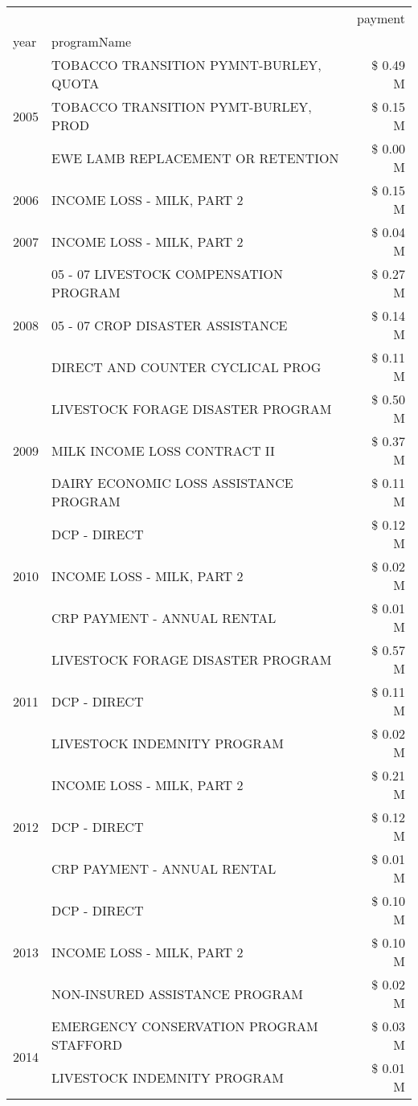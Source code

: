 \begin{tabular}{llr}
\toprule
 &  & payment \\
year & programName &  \\
\midrule
\multirow[t]{3}{*}{2005} & TOBACCO TRANSITION PYMNT-BURLEY, QUOTA & \$ 0.49 M \\
 & TOBACCO TRANSITION PYMT-BURLEY, PROD & \$ 0.15 M \\
 & EWE LAMB REPLACEMENT OR RETENTION & \$ 0.00 M \\
\cline{1-3}
2006 & INCOME LOSS - MILK, PART 2 & \$ 0.15 M \\
\cline{1-3}
2007 & INCOME LOSS - MILK, PART 2 & \$ 0.04 M \\
\cline{1-3}
\multirow[t]{3}{*}{2008} & 05 - 07 LIVESTOCK COMPENSATION PROGRAM & \$ 0.27 M \\
 & 05 - 07 CROP DISASTER ASSISTANCE & \$ 0.14 M \\
 & DIRECT AND COUNTER CYCLICAL PROG & \$ 0.11 M \\
\cline{1-3}
\multirow[t]{3}{*}{2009} & LIVESTOCK FORAGE DISASTER  PROGRAM & \$ 0.50 M \\
 & MILK INCOME LOSS CONTRACT II & \$ 0.37 M \\
 & DAIRY ECONOMIC LOSS ASSISTANCE PROGRAM & \$ 0.11 M \\
\cline{1-3}
\multirow[t]{3}{*}{2010} & DCP - DIRECT & \$ 0.12 M \\
 & INCOME LOSS - MILK, PART 2 & \$ 0.02 M \\
 & CRP PAYMENT - ANNUAL RENTAL & \$ 0.01 M \\
\cline{1-3}
\multirow[t]{3}{*}{2011} & LIVESTOCK FORAGE DISASTER PROGRAM & \$ 0.57 M \\
 & DCP - DIRECT & \$ 0.11 M \\
 & LIVESTOCK INDEMNITY PROGRAM & \$ 0.02 M \\
\cline{1-3}
\multirow[t]{3}{*}{2012} & INCOME LOSS - MILK, PART 2 & \$ 0.21 M \\
 & DCP - DIRECT & \$ 0.12 M \\
 & CRP PAYMENT - ANNUAL RENTAL & \$ 0.01 M \\
\cline{1-3}
\multirow[t]{3}{*}{2013} & DCP - DIRECT & \$ 0.10 M \\
 & INCOME LOSS - MILK, PART 2 & \$ 0.10 M \\
 & NON-INSURED ASSISTANCE PROGRAM & \$ 0.02 M \\
\cline{1-3}
\multirow[t]{3}{*}{2014} & EMERGENCY CONSERVATION PROGRAM STAFFORD & \$ 0.03 M \\
 & LIVESTOCK INDEMNITY PROGRAM & \$ 0.01 M \\

\end{tabular}
